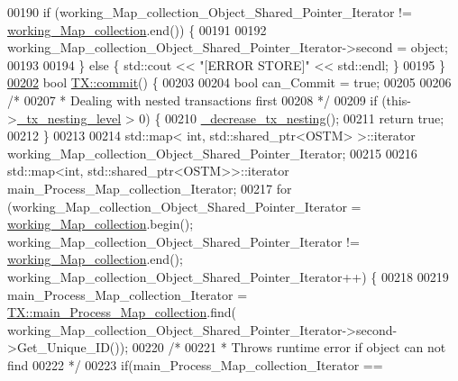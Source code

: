 \begin{DoxyCode}
00190     \textcolor{keywordflow}{if} (working\_Map\_collection\_Object\_Shared\_Pointer\_Iterator != 
      \hyperlink{class_t_x_a81aafda16e2f20e36ec6c68e584668ff_a81aafda16e2f20e36ec6c68e584668ff}{working\_Map\_collection}.end()) \{
00191 
00192         working\_Map\_collection\_Object\_Shared\_Pointer\_Iterator->second = object;
00193 
00194     \} \textcolor{keywordflow}{else} \{ std::cout << \textcolor{stringliteral}{"[ERROR STORE]"} << std::endl; \}
00195 \}
\hypertarget{_t_x_8cpp_source.tex_l00202}{}\hyperlink{class_t_x_a9dde5d356b35e557448e58d260087356_a9dde5d356b35e557448e58d260087356}{00202} \textcolor{keywordtype}{bool} \hyperlink{class_t_x_a9dde5d356b35e557448e58d260087356_a9dde5d356b35e557448e58d260087356}{TX::commit}() \{
00203     
00204     \textcolor{keywordtype}{bool} can\_Commit = \textcolor{keyword}{true};
00205  
00206     \textcolor{comment}{/*}
00207 \textcolor{comment}{     * Dealing with nested transactions first }
00208 \textcolor{comment}{     */}
00209     \textcolor{keywordflow}{if} (this->\hyperlink{class_t_x_ae8f413fd7f4fea322e7ad3c668f9898e_ae8f413fd7f4fea322e7ad3c668f9898e}{\_tx\_nesting\_level} > 0) \{
00210         \hyperlink{class_t_x_aa3ac499f576326588628ade96b27b4b1_aa3ac499f576326588628ade96b27b4b1}{\_decrease\_tx\_nesting}();
00211         \textcolor{keywordflow}{return} \textcolor{keyword}{true};
00212     \} 
00213     
00214     std::map< int, std::shared\_ptr<OSTM> >::iterator working\_Map\_collection\_Object\_Shared\_Pointer\_Iterator;
00215 
00216     std::map<int, std::shared\_ptr<OSTM>>::iterator main\_Process\_Map\_collection\_Iterator;
00217     \textcolor{keywordflow}{for} (working\_Map\_collection\_Object\_Shared\_Pointer\_Iterator = 
      \hyperlink{class_t_x_a81aafda16e2f20e36ec6c68e584668ff_a81aafda16e2f20e36ec6c68e584668ff}{working\_Map\_collection}.begin(); working\_Map\_collection\_Object\_Shared\_Pointer\_Iterator
       != \hyperlink{class_t_x_a81aafda16e2f20e36ec6c68e584668ff_a81aafda16e2f20e36ec6c68e584668ff}{working\_Map\_collection}.end(); 
      working\_Map\_collection\_Object\_Shared\_Pointer\_Iterator++) \{
00218 
00219             main\_Process\_Map\_collection\_Iterator = 
      \hyperlink{class_t_x_a1a45d726894190695314464d7cd97c29_a1a45d726894190695314464d7cd97c29}{TX::main\_Process\_Map\_collection}.find(
      working\_Map\_collection\_Object\_Shared\_Pointer\_Iterator->second->Get\_Unique\_ID());
00220             \textcolor{comment}{/*}
00221 \textcolor{comment}{             * Throws runtime error if object can not find}
00222 \textcolor{comment}{             */}
00223             \textcolor{keywordflow}{if}(main\_Process\_Map\_collection\_Iterator == 

\end{DoxyCode}
